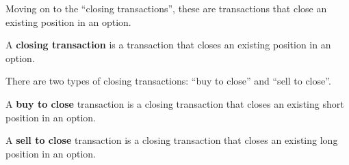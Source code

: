 Moving on to the ``closing transactions'', these are transactions that close an existing position in an option.

A \textbf{closing transaction} is a transaction that closes an existing position in an option.
\ed

There are two types of closing transactions: ``buy to close'' and ``sell to close''.

A \textbf{buy to close} transaction is a closing transaction that closes an existing short position in an option.
\ed

A \textbf{sell to close} transaction is a closing transaction that closes an existing long position in an option.
\ed

